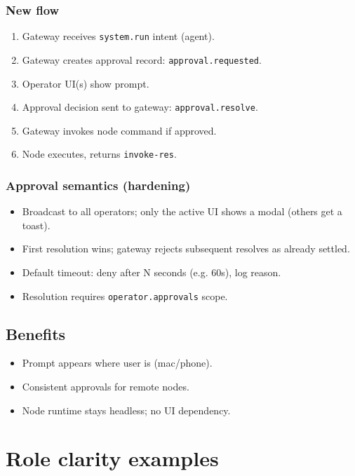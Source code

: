 \subsubsection{New flow}


\begin{enumerate}
  \item Gateway receives \texttt{system.run} intent (agent).
  \item Gateway creates approval record: \texttt{approval.requested}.
  \item Operator UI(s) show prompt.
  \item Approval decision sent to gateway: \texttt{approval.resolve}.
  \item Gateway invokes node command if approved.
  \item Node executes, returns \texttt{invoke-res}.
\end{enumerate}


\subsubsection{Approval semantics (hardening)}


\begin{itemize}
  \item Broadcast to all operators; only the active UI shows a modal (others get a toast).
  \item First resolution wins; gateway rejects subsequent resolves as already settled.
  \item Default timeout: deny after N seconds (e.g. 60s), log reason.
  \item Resolution requires \texttt{operator.approvals} scope.
\end{itemize}


\subsection{Benefits}


\begin{itemize}
  \item Prompt appears where user is (mac/phone).
  \item Consistent approvals for remote nodes.
  \item Node runtime stays headless; no UI dependency.
\end{itemize}


\hrulefill


\section{Role clarity examples}


